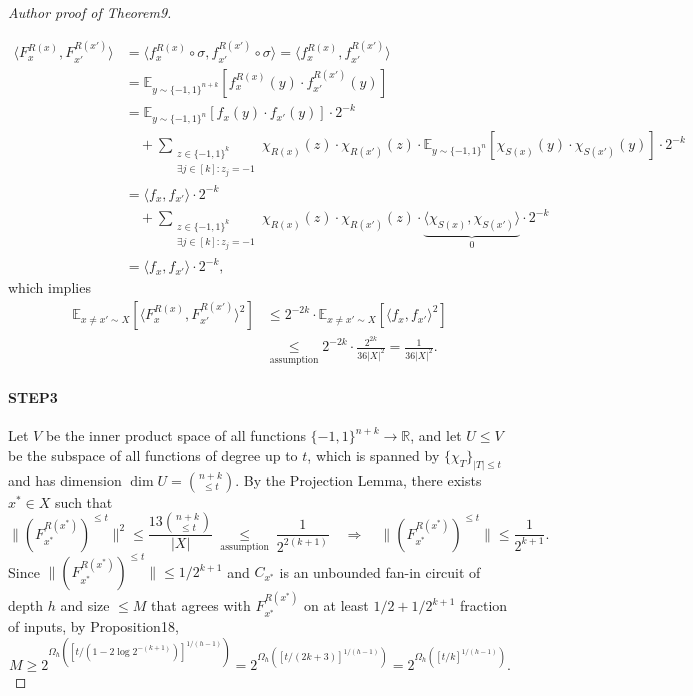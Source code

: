 \begin{proof}[Author proof of Theorem9]
\begin{itemize}
\begin{align*}\langle F_x^{R(x)},F_{x'}^{R(x')}\rangle&=\langle f_x^{R(x)}\circ\sigma,f_{x'}^{R(x')}\circ\sigma\rangle=\langle f_x^{R(x)},f_{x'}^{R(x')}\rangle\\&=\mathbb E_{y\sim\{-1,1\}^{n+k}}[f_x^{R(x)}(y)\cdot f_{x'}^{R(x')}(y)]\\&=\mathbb E_{y\sim\{-1,1\}^n}[f_x(y)\cdot f_{x'}(y)]\cdot2^{-k}\\&\quad+\sum_{\substack{z\in\{-1,1\}^k\\\exists j\in[k]:z_j=-1}}\chi_{R(x)}(z)\cdot\chi_{R(x')}(z)\cdot\mathbb E_{y\sim\{-1,1\}^n}[\chi_{S(x)}(y)\cdot\chi_{S(x')}(y)]\cdot2^{-k}\\&=\langle f_x,f_{x'}\rangle\cdot2^{-k}\\&\quad+\sum_{\substack{z\in\{-1,1\}^k\\\exists j\in[k]:z_j=-1}}\chi_{R(x)}(z)\cdot\chi_{R(x')}(z)\cdot\underbrace{\langle\chi_{S(x)},\chi_{S(x')}\rangle}_{0}\cdot2^{-k}\\&=\langle f_x,f_{x'}\rangle\cdot2^{-k},\end{align*}
which implies
\begin{align*}\mathbb E_{x\ne x'\sim X}[\langle F_x^{R(x)},F_{x'}^{R(x')}\rangle^2]&\leq2^{-2k}\cdot\mathbb E_{x\ne x'\sim X}[\langle f_x,f_{x'}\rangle^2]\\&\underset{\text{assumption}}\leq2^{-2k}\cdot\frac{2^{2k}}{36|X|^2}=\frac1{36|X|^2}.\end{align*}
\end{itemize}
\paragraph{STEP3}
Let $V$ be the inner product space of all functions $\{-1,1\}^{n+k}\to\mathbb R$, and let $U\leq V$ be the subspace of all functions of degree up to $t$, which is spanned by $\{\chi_T\}_{|T|\leq t}$ and has dimension $\dim U=\binom{n+k}{\leq t}$. By the Projection Lemma, there exists $x^*\in X$ such that
\[\|(F_{x^*}^{R(x^*)})^{\leq t}\|^2\leq\frac{13\binom{n+k}{\leq t}}{|X|}\ \underset{\text{assumption}}\leq\ \frac1{2^{2(k+1)}}\quad\Longrightarrow\quad\|(F_{x^*}^{R(x^*)})^{\leq t}\|\leq\frac1{2^{k+1}}.\]
Since $\|(F_{x^*}^{R(x^*)})^{\leq t}\|\leq1/2^{k+1}$ and $C_{x^*}$ is an unbounded fan-in circuit of depth $h$ and size $\leq M$ that agrees with $F_{x^*}^{R(x^*)}$ on at least $1/2+1/2^{k+1}$ fraction of inputs, by Proposition18,
\[M\geq2^{\Omega_h([t/(1-2\log2^{-(k+1)})]^{1/(h-1)})}=2^{\Omega_h([t/(2k+3)]^{1/(h-1)})}=2^{\Omega_h([t/k]^{1/(h-1)})}.\]
\end{proof}

